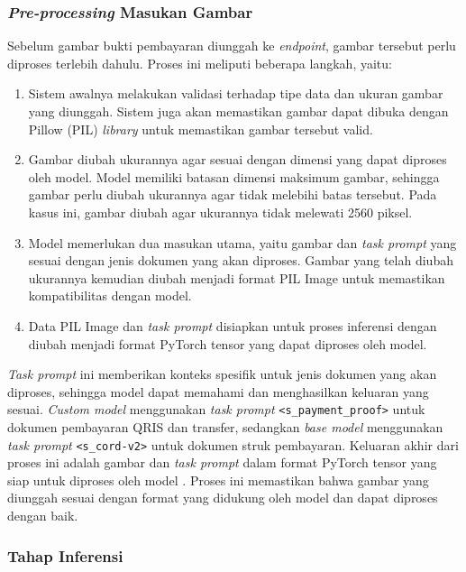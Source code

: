 \subsubsection{\emph{Pre-processing} Masukan Gambar}
\label{subsec:pre-processing}
Sebelum gambar bukti pembayaran diunggah ke \emph{endpoint}, gambar tersebut perlu diproses terlebih dahulu. Proses ini meliputi beberapa langkah, yaitu:
\begin{enumerate}
    \item Sistem awalnya melakukan validasi terhadap tipe data dan ukuran gambar yang diunggah. Sistem juga akan memastikan gambar dapat dibuka dengan Pillow (PIL) \emph{library} untuk memastikan gambar tersebut valid.
    \item Gambar diubah ukurannya agar sesuai dengan dimensi yang dapat diproses oleh model. Model \donut{} memiliki batasan dimensi maksimum gambar, sehingga gambar perlu diubah ukurannya agar tidak melebihi batas tersebut. Pada kasus ini, gambar diubah agar ukurannya tidak melewati 2560 piksel.
    \item Model memerlukan dua masukan utama, yaitu gambar dan \emph{task prompt} yang sesuai dengan jenis dokumen yang akan diproses. Gambar yang telah diubah ukurannya kemudian diubah menjadi format PIL Image untuk memastikan kompatibilitas dengan model.
    \item Data PIL Image dan \emph{task prompt} disiapkan untuk proses inferensi dengan diubah menjadi format PyTorch tensor yang dapat diproses oleh model.
\end{enumerate}

\emph{Task prompt} ini memberikan konteks spesifik untuk jenis dokumen yang akan diproses, sehingga model dapat memahami dan menghasilkan keluaran yang sesuai. \emph{Custom model} menggunakan \emph{task prompt} \texttt{<s\_payment\_proof>} untuk dokumen pembayaran QRIS dan transfer, sedangkan \emph{base model} menggunakan \emph{task prompt} \texttt{<s\_cord-v2>} untuk dokumen struk pembayaran. Keluaran akhir dari proses ini adalah gambar dan \emph{task prompt} dalam format PyTorch tensor yang siap untuk diproses oleh model \donut. Proses ini memastikan bahwa gambar yang diunggah sesuai dengan format yang didukung oleh model dan dapat diproses dengan baik.

\subsubsection{Tahap Inferensi}
\label{subsubsec:proses-inferens}

